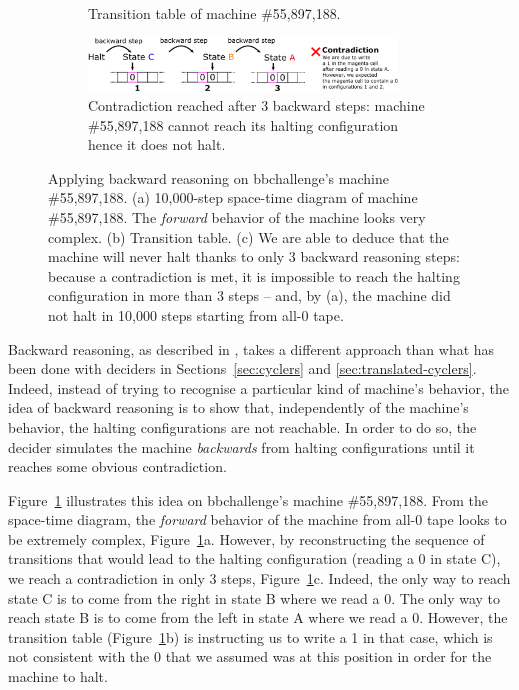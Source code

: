 \begin{figure}
\begin{subfigure}[m]{0.45\textwidth}
    \caption{Transition table of machine \#55,897,188.}

  \end{subfigure}

  \begin{subfigure}[m]{1\textwidth}
    \vspace{5ex}
    \centering
    \includegraphics[width=0.9\textwidth]{figures/backward-reasoning/backward-reasoning.pdf}

    \caption{Contradiction reached after 3 backward steps: machine \#55,897,188 cannot reach its halting configuration hence it does not halt.}

  \end{subfigure}

  \caption{Applying backward reasoning on bbchallenge's machine \#55,897,188. (a) 10,000-step space-time diagram of machine \#55,897,188. The \textit{forward} behavior of the machine looks very complex. (b) Transition table. (c) We are able to deduce that the machine will never halt thanks to only 3 backward reasoning steps: because a contradiction is met, it is impossible to reach the halting configuration in more than 3 steps -- and, by (a), the machine did not halt in 10,000 steps starting from all-0 tape.}
  \label{fig:backward-reasoning}
\end{figure}


Backward reasoning, as described in \cite{Marxen_1998}, takes a different approach than what has been done with deciders in Sections~\ref{sec:cyclers} and \ref{sec:translated-cyclers}. Indeed, instead of trying to recognise a particular kind of machine's behavior, the idea of backward reasoning is to show that, independently of the machine's behavior, the halting configurations are not reachable. In order to do so, the decider simulates the machine \textit{backwards} from halting configurations until it reaches some obvious contradiction.

Figure~\ref{fig:backward-reasoning} illustrates this idea on bbchallenge's machine \#55,897,188. From the space-time diagram, the \textit{forward} behavior of the machine from all-0 tape looks to be extremely complex, Figure~\ref{fig:backward-reasoning}a. However, by reconstructing the sequence of transitions that would lead to the halting configuration (reading a 0 in state \textcolor{colorC}{C}), we reach a contradiction in only 3 steps, Figure~\ref{fig:backward-reasoning}c. Indeed, the only way to reach state \textcolor{colorC}{C} is to come from the right in state \textcolor{colorB}{B} where we read a 0. The only way to reach state \textcolor{colorB}{B} is to come from the left in state \textcolor{colorA}{A} where we read a 0. However, the transition table (Figure~\ref{fig:backward-reasoning}b) is instructing us to write a 1 in that case, which is not consistent with the 0 that we assumed was at this position in order for the machine to halt.

